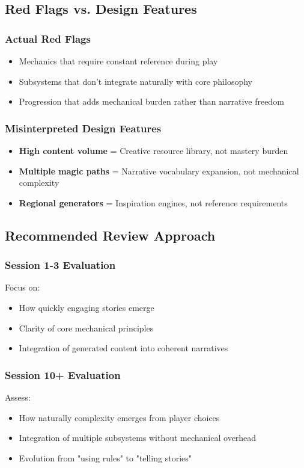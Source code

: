 \subsection{Red Flags vs. Design Features}

\subsubsection{Actual Red Flags}
\begin{itemize}
    \item Mechanics that require constant reference during play
    \item Subsystems that don't integrate naturally with core philosophy
    \item Progression that adds mechanical burden rather than narrative freedom
\end{itemize}

\subsubsection{Misinterpreted Design Features}
\begin{itemize}
    \item \textbf{High content volume} = Creative resource library, not mastery burden
    \item \textbf{Multiple magic paths} = Narrative vocabulary expansion, not mechanical complexity
    \item \textbf{Regional generators} = Inspiration engines, not reference requirements
\end{itemize}

\subsection{Recommended Review Approach}

\subsubsection{Session 1-3 Evaluation}
Focus on:
\begin{itemize}
    \item How quickly engaging stories emerge
    \item Clarity of core mechanical principles
    \item Integration of generated content into coherent narratives
\end{itemize}

\subsubsection{Session 10+ Evaluation}  
Assess:
\begin{itemize}
    \item How naturally complexity emerges from player choices
    \item Integration of multiple subsystems without mechanical overhead
    \item Evolution from "using rules" to "telling stories"
\end{itemize}


